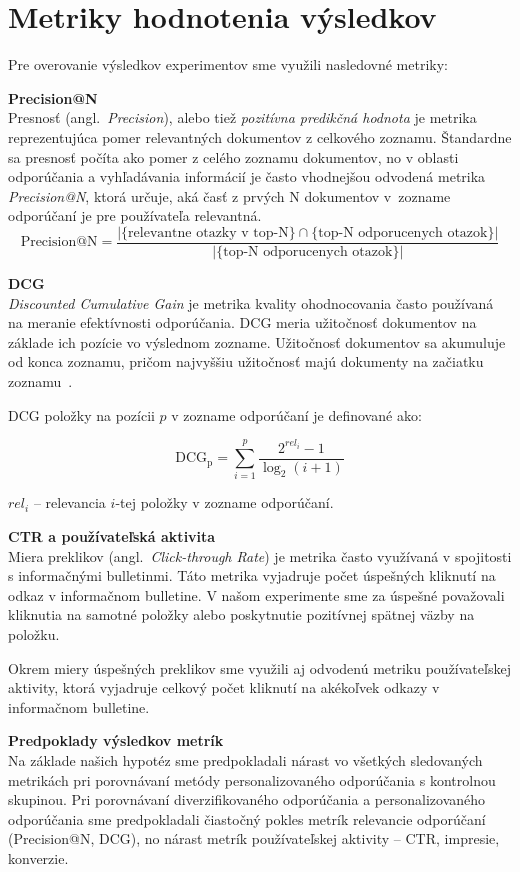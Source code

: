 \section{Metriky hodnotenia výsledkov}

Pre overovanie výsledkov experimentov sme využili nasledovné metriky:

\textbf{Precision@N}\\
Presnosť (angl.~\emph{Precision}), alebo tiež \textit{pozitívna predikčná hodnota} je metrika reprezentujúca pomer relevantných
dokumentov z celkového zoznamu. Štandardne sa presnosť počíta ako pomer z celého zoznamu dokumentov, no v oblasti
odporúčania a vyhľadávania informácií je často vhodnejšou odvodená metrika \textit{Precision@N}, ktorá určuje, aká časť
z prvých N dokumentov v~zozname odporúčaní je pre používateľa relevantná.
$$\mbox{Precision@N}=\frac{|\{\mbox{relevantne otazky v top-N}\}\cap\{\mbox{top-N odporucenych otazok}\}|}
{|\{\mbox{top-N odporucenych otazok}\}|}$$

\textbf{DCG}\\
\textit{Discounted Cumulative Gain} je metrika kvality ohodnocovania často používaná na meranie efektívnosti
odporúčania. DCG meria užitočnosť dokumentov na základe ich pozície vo výslednom zozname. Užitočnosť dokumentov sa akumuluje
od konca zoznamu, pričom najvyššiu užitočnosť majú dokumenty na začiatku zoznamu~\cite{Jrvelin2002}.

DCG položky na pozícii $p$ v zozname odporúčaní je definované ako:

$$\mathrm{DCG_{p}} = \sum_{i=1}^{p} \frac{ 2^{rel_{i}} - 1 }{ \log_{2}(i+1)}$$
\begin{adjustwidth}{1cm}{1cm}
$rel_i$ -- relevancia $i$-tej položky v zozname odporúčaní.\\
\end{adjustwidth}

\textbf{CTR a používateľská aktivita}\\
Miera preklikov (angl.~\emph{Click-through Rate}) je metrika často využívaná v spojitosti s informačnými bulletinmi.
Táto metrika vyjadruje počet úspešných kliknutí na odkaz v informačnom bulletine. V našom experimente sme za úspešné
považovali kliknutia na samotné položky alebo poskytnutie pozitívnej spätnej väzby na položku.

Okrem miery úspešných preklikov sme využili aj odvodenú metriku používateľskej aktivity, ktorá vyjadruje celkový počet
kliknutí na akékoľvek odkazy v informačnom bulletine.

\textbf{Predpoklady výsledkov metrík}\\
Na základe našich hypotéz sme predpokladali nárast vo všetkých sledovaných metrikách pri porovnávaní metódy personalizovaného
odporúčania s kontrolnou skupinou. Pri porovnávaní diverzifikovaného odporúčania a personalizovaného odporúčania sme
predpokladali čiastočný pokles metrík relevancie odporúčaní (Precision@N, DCG), no nárast metrík používateľskej aktivity
-- CTR, impresie, konverzie.


